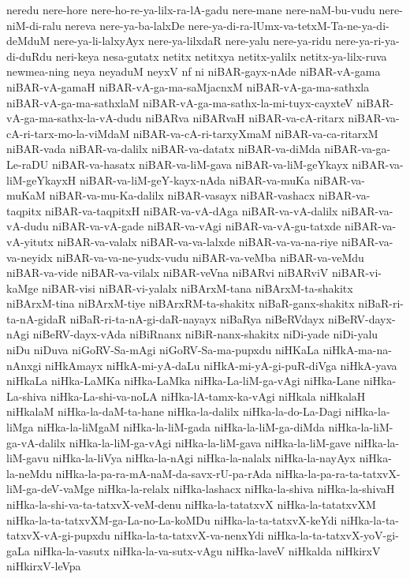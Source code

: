 {neredu
nere-hore
nere-ho-re-ya-lilx-ra-lA-gadu
nere-mane
nere-naM-bu-vudu
nere-niM-di-ralu
nereva
nere-ya-ba-lalxDe
nere-ya-di-ra-lUmx-va-tetxM-Ta-ne-ya-di-deMduM
nere-ya-li-lalxyAyx
nere-ya-lilxdaR
nere-yalu
nere-ya-ridu
nere-ya-ri-ya-di-duRdu
neri-keya
nesa-gutatx
netitx
netitxya
netitx-yalilx
netitx-ya-lilx-ruva
newmea-ning
neya
neyaduM
neyxV
nf
ni
niBAR-gayx-nAde
niBAR-vA-gama
niBAR-vA-gamaH
niBAR-vA-ga-ma-saMjacnxM
niBAR-vA-ga-ma-sathxla
niBAR-vA-ga-ma-sathxlaM
niBAR-vA-ga-ma-sathx-la-mi-tuyx-cayxteV
niBAR-vA-ga-ma-sathx-la-vA-dudu
niBARva
niBARvaH
niBAR-va-cA-ritarx
niBAR-va-cA-ri-tarx-mo-la-viMdaM
niBAR-va-cA-ri-tarxyXmaM
niBAR-va-ca-ritarxM
niBAR-vada
niBAR-va-dalilx
niBAR-va-datatx
niBAR-va-diMda
niBAR-va-ga-Le-raDU
niBAR-va-hasatx
niBAR-va-liM-gava
niBAR-va-liM-geYkayx
niBAR-va-liM-geYkayxH
niBAR-va-liM-geY-kayx-nAda
niBAR-va-muKa
niBAR-va-muKaM
niBAR-va-mu-Ka-dalilx
niBAR-vasayx
niBAR-vashacx
niBAR-va-taqpitx
niBAR-va-taqpitxH
niBAR-va-vA-dAga
niBAR-va-vA-dalilx
niBAR-va-vA-dudu
niBAR-va-vA-gade
niBAR-va-vAgi
niBAR-va-vA-gu-tatxde
niBAR-va-vA-yitutx
niBAR-va-valalx
niBAR-va-va-lalxde
niBAR-va-va-na-riye
niBAR-va-va-neyidx
niBAR-va-va-ne-yudx-vudu
niBAR-va-veMba
niBAR-va-veMdu
niBAR-va-vide
niBAR-va-vilalx
niBAR-veVna
niBARvi
niBARviV
niBAR-vi-kaMge
niBAR-visi
niBAR-vi-yalalx
niBArxM-tana
niBArxM-ta-shakitx
niBArxM-tina
niBArxM-tiye
niBArxRM-ta-shakitx
niBaR-ganx-shakitx
niBaR-ri-ta-nA-gidaR
niBaR-ri-ta-nA-gi-daR-nayayx
niBaRya
niBeRVdayx
niBeRV-dayx-nAgi
niBeRV-dayx-vAda
niBiRnanx
niBiR-nanx-shakitx
niDi-yade
niDi-yalu
niDu
niDuva
niGoRV-Sa-mAgi
niGoRV-Sa-ma-pupxdu
niHKaLa
niHkA-ma-na-nAnxgi
niHkAmayx
niHkA-mi-yA-daLu
niHkA-mi-yA-gi-puR-diVga
niHkA-yava
niHkaLa
niHka-LaMKa
niHka-LaMka
niHka-La-liM-ga-vAgi
niHka-Lane
niHka-La-shiva
niHka-La-shi-va-noLA
niHka-lA-tamx-ka-vAgi
niHkala
niHkalaH
niHkalaM
niHka-la-daM-ta-hane
niHka-la-dalilx
niHka-la-do-La-Dagi
niHka-la-liMga
niHka-la-liMgaM
niHka-la-liM-gada
niHka-la-liM-ga-diMda
niHka-la-liM-ga-vA-dalilx
niHka-la-liM-ga-vAgi
niHka-la-liM-gava
niHka-la-liM-gave
niHka-la-liM-gavu
niHka-la-liVya
niHka-la-nAgi
niHka-la-nalalx
niHka-la-nayAyx
niHka-la-neMdu
niHka-la-pa-ra-mA-naM-da-savx-rU-pa-rAda
niHka-la-pa-ra-ta-tatxvX-liM-ga-deV-vaMge
niHka-la-relalx
niHka-lashacx
niHka-la-shiva
niHka-la-shivaH
niHka-la-shi-va-ta-tatxvX-veM-denu
niHka-la-tatatxvX
niHka-la-tatatxvXM
niHka-la-ta-tatxvXM-ga-La-no-La-koMDu
niHka-la-ta-tatxvX-keYdi
niHka-la-ta-tatxvX-vA-gi-pupxdu
niHka-la-ta-tatxvX-va-nenxYdi
niHka-la-ta-tatxvX-yoV-gi-gaLa
niHka-la-vasutx
niHka-la-va-sutx-vAgu
niHka-laveV
niHkalda
niHkirxV
niHkirxV-leVpa
}
